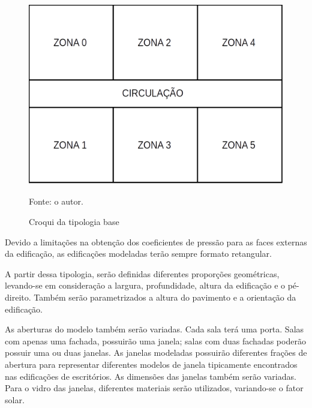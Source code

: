 \documentclass[brazil,hardcopy,openany,a5paper]{ufscthesis}
\begin{document}
		\begin{figure}[h]
			\centering
			\caption{Croqui da tipologia base}
			\includegraphics[width=1\linewidth]{img/croqui.png}
			\label{fig:croqui}
			\begin{flushleft}
				Fonte: o autor.
			\end{flushleft}
		\end{figure}
		
		Devido a limitações na obtenção dos coeficientes de pressão para as faces externas da edificação, as edificações modeladas terão sempre formato retangular.
		
		A partir dessa tipologia, serão definidas diferentes proporções geométricas, levando-se em consideração a largura, profundidade, altura da edificação e o pé-direito. Também serão parametrizados a altura do pavimento e a orientação da edificação.
		
		As aberturas do modelo também serão variadas. Cada sala terá uma porta. Salas com apenas uma fachada, possuirão uma janela; salas com duas fachadas poderão possuir uma ou duas janelas. As janelas modeladas possuirão diferentes frações de abertura para representar diferentes modelos de janela tipicamente encontrados nas edificações de escritórios. As dimensões das janelas também serão variadas.
		Para o vidro das janelas, diferentes materiais serão utilizados, variando-se o fator solar.
		
\end{document}
